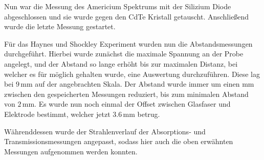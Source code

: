 Nun war die Messung des Americium Spektrums mit der Silizium Diode abgeschlossen und sie wurde gegen den CdTe Kristall getauscht. Anschließend wurde die letzte Messung gestartet. \par
Für das Haynes und Shockley Experiment wurden nun die Abstandsmessungen durchgeführt. Hierbei wurde zunächst die maximale Spannung an der Probe angelegt, und der Abstand so lange erhöht bis zur maximalen Distanz, bei welcher es für möglich gehalten wurde, eine Auswertung durchzuführen. Diese lag bei $9\,$mm auf der angebrachten Skala. Der Abstand wurde immer um einen mm zwischen den gespeicherten Messungen reduziert, bis zum minimalen Abstand von $2\,$mm. Es wurde nun noch einmal der Offset zwischen Glasfaser und Elektrode bestimmt, welcher jetzt $3.6\,$mm betrug. \par
Währenddessen wurde der Strahlenverlauf der Absorptions- und Transmissionsmessungen angepasst, sodass hier auch die oben erwähnten Messungen aufgenommen werden konnten.